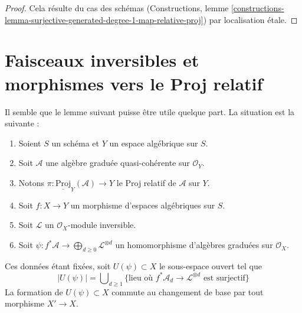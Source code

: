 \begin{proof}
Cela résulte du cas des schémas
(Constructions, lemme
\ref{constructions-lemma-surjective-generated-degree-1-map-relative-proj})
par localisation \'etale.
\end{proof}










\section{Faisceaux inversibles et morphismes vers le Proj relatif}
\label{section-invertible-relative-proj}

\noindent
Il semble que le lemme suivant puisse être utile quelque part.
La situation est la suivante :
\begin{enumerate}
\item Soient $S$ un schéma et $Y$ un espace algébrique sur $S$.
\item Soit $\mathcal{A}$ une algèbre graduée quasi-cohérente sur $\mathcal{O}_Y$.
\item Notons $\pi : \underline{\text{Proj}}_Y(\mathcal{A}) \to Y$ le Proj
relatif de $\mathcal{A}$ sur $Y$.
\item Soit $f : X \to Y$ un morphisme d'espaces algébriques sur $S$.
\item Soit $\mathcal{L}$ un $\mathcal{O}_X$-module inversible.
\item Soit
$\psi : f^*\mathcal{A} \to \bigoplus_{d \geq 0} \mathcal{L}^{\otimes d}$
un homomorphisme d'algèbres graduées sur $\mathcal{O}_X$.
\end{enumerate}
Ces données étant fixées, soit $U(\psi) \subset X$ le sous-espace ouvert tel que
$$
|U(\psi)| = \bigcup\nolimits_{d \geq 1}
\{\text{lieu où }f^*\mathcal{A}_d \to \mathcal{L}^{\otimes d}
\text{ est surjectif}\}
$$
La formation de $U(\psi) \subset X$ commute au
changement de base par tout morphisme $X' \to X$.

